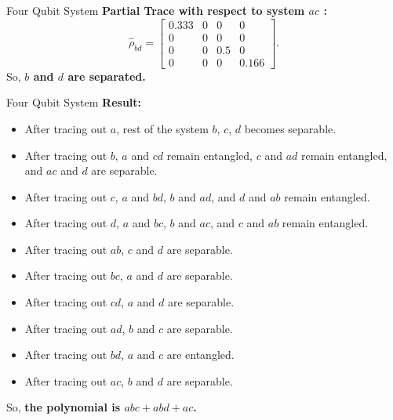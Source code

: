 \documentclass{beamer}
\begin{document}
\begin{frame}{Four Qubit System}
	\textbf{Partial Trace with respect to system $ac$ :}
	\begin{equation*}
		\hat{\rho}_{bd} = \left[\begin{matrix}0.333 & 0 & 0 & 0\\0 & 0 & 0 & 0\\0 & 0 & 0.5 & 0\\0 & 0 & 0 & 0.166\end{matrix}\right]
		.
	\end{equation*}
So, \textbf{$b$ and $d$ are separated.}
\end{frame}

\begin{frame}{Four Qubit System}
	\textbf{Result:}
	\begin{itemize}
		\item After tracing out $a$, rest of the system $b$, $c$, $d$ becomes separable.
		\item After tracing out $b$, $a$ and $cd$ remain entangled, $c$ and $ad$ remain entangled, and $ac$ and $d$ are separable.
		\item After tracing out $c$, $a$ and $bd$, $b$ and $ad$, and $d$ and $ab$ remain entangled.
		\item After tracing out $d$, $a$ and $bc$, $b$ and $ac$, and $c$ and $ab$ remain entangled.
		\item After tracing out $ab$, $c$ and $d$ are separable.
		\item After tracing out $bc$, $a$ and $d$ are separable.
		\item After tracing out $cd$, $a$ and $d$ are separable.
		\item After tracing out $ad$, $b$ and $c$ are separable.
		\item After tracing out $bd$, $a$ and $c$ are entangled.
		\item After tracing out $ac$, $b$ and $d$ are separable.
	\end{itemize}
So, \textbf{the polynomial is $abc + abd + ac$.}
\end{frame}
\end{document}

